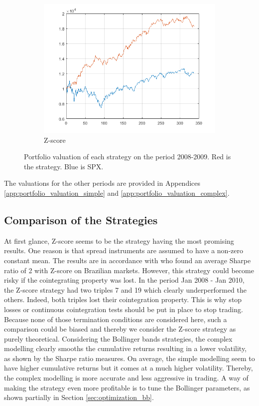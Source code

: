 \documentclass[11pt,a4,twosided,singlespacing,titlepagenumber=on]{scrreprt}
\numberwithin{equation}{chapter} %
\theoremstyle{remark}
\begin{document}
\begin{figure}[H]
\begin{subfigure}[t]{0.32\textwidth}
        \includegraphics[width=1\textwidth]{res/strats/zscore}
        \caption{Z-score}
    \end{subfigure}
    \caption{Portfolio valuation of each strategy on the period 2008-2009. Red is the strategy. Blue is SPX.}
    \label{fig:portfolio_valuations}
\end{figure}

The valuations for the other periods are provided in Appendices \ref{app:portfolio_valuation_simple} and \ref{app:portfolio_valuation_complex}.

\subsection{Comparison of the Strategies}
At first glance, Z-score seems to be the strategy having the most promising results. One reason is that spread instruments are assumed to have a non-zero constant mean. The results are in accordance with \cite{caldeira2013} who found an average Sharpe ratio of 2 with Z-score on Brazilian markets. However, this strategy could become risky if the cointegrating property was lost. In the period Jan 2008 - Jan 2010, the Z-score strategy had two triples 7 and 19 which clearly underperformed the others. Indeed, both triples lost their cointegration property. This is why stop losses or continuous cointegration tests should be put in place to stop trading. Because none of those termination conditions are considered here, such a comparison could be biased and thereby we consider the Z-score strategy as purely theoretical. Considering the Bollinger bands strategies, the complex modelling clearly smooths the cumulative returns resulting in a lower volatility, as shown by the Sharpe ratio measures. On average, the simple modelling seem to have higher cumulative returns but it comes at a much higher volatility. Thereby, the complex modelling is more accurate and less aggressive in trading. A way of making the strategy even more profitable is to tune the Bollinger parameters, as shown partially in  Section \ref{sec:optimization_bb}.
\end{document}

